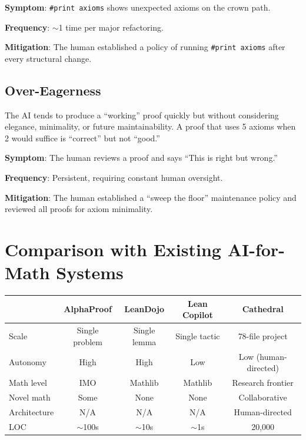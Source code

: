 \documentclass[11pt,a4paper]{article}
\newcommand{\lean}[1]{\texttt{#1}}
\begin{document}
\textbf{Symptom}: \lean{\#print axioms} shows unexpected axioms on
the crown path.

\textbf{Frequency}: $\sim$1 time per major refactoring.

\textbf{Mitigation}: The human established a policy of running
\lean{\#print axioms} after every structural change.

\subsection{Over-Eagerness}

The AI tends to produce a ``working'' proof quickly but without
considering elegance, minimality, or future maintainability. A proof
that uses 5 axioms when 2 would suffice is ``correct'' but not
``good.''

\textbf{Symptom}: The human reviews a proof and says ``This is
right but wrong.''

\textbf{Frequency}: Persistent, requiring constant human oversight.

\textbf{Mitigation}: The human established a ``sweep the floor''
maintenance policy and reviewed all proofs for axiom minimality.

\section{Comparison with Existing AI-for-Math Systems}
\label{sec:comparison}

\begin{center}
\small
\begin{tabular}{@{}lcccc@{}}
\toprule
& \textbf{AlphaProof} & \textbf{LeanDojo} & \textbf{Lean Copilot} & \textbf{Cathedral} \\
\midrule
Scale & Single problem & Single lemma & Single tactic & 78-file project \\
Autonomy & High & High & Low & Low (human-directed) \\
Math level & IMO & Mathlib & Mathlib & Research frontier \\
Novel math & Some & None & None & Collaborative \\
Architecture & N/A & N/A & N/A & Human-directed \\
LOC & $\sim$100s & $\sim$10s & $\sim$1s & 20,000 \\
\bottomrule
\end{tabular}
\end{center}
\end{document}
